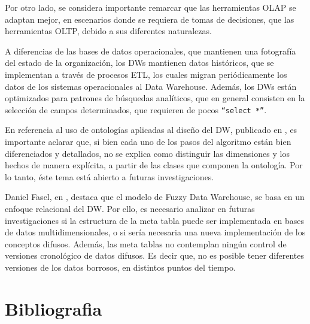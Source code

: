 \documentclass[a4paper,11pt]{article}
\begin{document}
  Por otro lado, se considera importante remarcar que las herramientas OLAP se adaptan mejor, en escenarios donde se requiera de tomas de decisiones,
  que las herramientas OLTP, debido a sus diferentes naturalezas.
 
  A diferencias de las bases de datos operacionales, que mantienen una fotografía del estado
  de la organización, los DWs mantienen datos históricos, que se implementan a través de procesos ETL, los cuales migran periódicamente los datos de los sistemas
  operacionales al Data Warehouse.
  Además, los DWs están optimizados para patrones de búsquedas analíticos, que en general consisten en la selección de campos determinados, que requieren de pocos
  \texttt{``select *''}.
 
  
  En referencia al uso de ontologías aplicadas al diseño del DW, publicado en \cite{ontologias}, es importante aclarar que, si bien cada uno de los pasos del
  algoritmo están bien diferenciados y detallados, no se explica como distinguir las dimensiones y los hechos de manera explícita, a partir de las clases
  que componen la ontología. Por lo tanto, éste tema está abierto a futuras investigaciones.
  
  Daniel Fasel, en \cite {Fasel14}, destaca que el modelo de Fuzzy Data Warehouse, se basa en un enfoque relacional del DW.
  Por ello, es necesario analizar en futuras investigaciones si la estructura de la meta tabla puede ser implementada en bases de datos multidimensionales,
  o si sería necesaria una nueva implementación de los conceptos difusos.
  Además, las meta tablas no contemplan ningún control de versiones cronológico de datos difusos.
  Es decir que, no es posible tener diferentes versiones de los datos borrosos, en distintos puntos del tiempo.
  


  \section{Bibliografia}

  \printbibliography

  
  
  \printindex %
  
\end{document}
